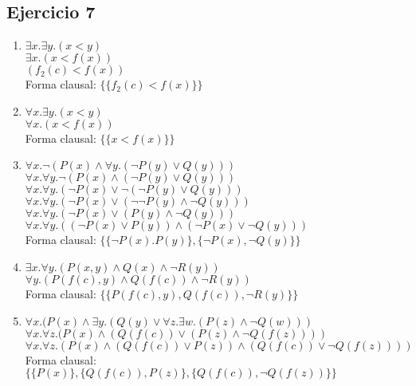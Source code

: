 \documentclass[10pt,a4paper]{article}
\begin{document}
\subsection{Ejercicio 7}
    \begin{enumerate}
        \item 
        $\exists x. \exists y. (x<y)$ \\
        $\exists x. (x<f(x))$ \\
        $(f_{2}(c)<f(x))$ \\
        Forma clausal: $\{\{f_{2}(c)<f(x)\}\}$
        \item 
        $\forall x. \exists y. (x<y)$ \\
        $\forall x. (x<f(x))$ \\
        Forma clausal: $\{\{x<f(x)\}\}$
        \item 
        $\forall x. \neg(P(x) \wedge \forall y.(\neg P(y) \vee Q(y)))$ \\
        $\forall x. \forall y. \neg(P(x) \wedge (\neg P(y) \vee Q(y)))$ \\
        $\forall x. \forall y. (\neg P(x) \vee \neg(\neg P(y) \vee Q(y)))$ \\
        $\forall x. \forall y. (\neg P(x) \vee (\neg \neg P(y) \wedge \neg Q(y)))$ \\
        $\forall x. \forall y. (\neg P(x) \vee (P(y) \wedge \neg Q(y)))$ \\
        $\forall x. \forall y. ( (\neg P(x) \vee P(y)) \wedge (\neg P(x) \vee \neg Q(y) ) )$ \\
        Forma clausal: $\{\{ \neg P(x). P(y)\},\{ \neg P(x), \neg Q(y)\}\}$
        \item 
        $\exists x. \forall y. (P(x,y) \wedge Q(x) \wedge \neg R(y))$ \\
        $\forall y. (P(f(c),y) \wedge Q(f(c)) \wedge \neg R(y))$ \\
        Forma clausal: $\{\{P(f(c),y), Q(f(c)), \neg R(y)\}\}$
        \item 
        $\forall x. (P(x) \wedge \exists y. (Q(y) \vee \forall z. \exists w. (P(z) \wedge \neg Q(w)))$ \\
        $\forall x. \forall z. (P(x) \wedge (Q(f(c)) \vee (P(z) \wedge \neg Q(f(z))))$ \\
        $\forall x. \forall z. (P(x) \wedge (Q(f(c)) \vee P(z) ) \wedge (Q(f(c)) \vee \neg Q(f(z)) ) )$ \\
        Forma clausal: $\{\{ P(x)\} , \{Q(f(c)), P(z)\} , \{Q(f(c)), \neg Q(f(z))\} \}$
    \end{enumerate}
\end{document}
